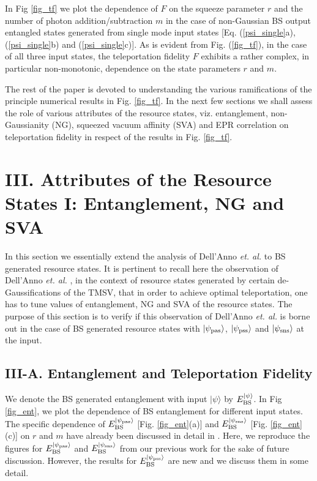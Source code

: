 \documentclass[letter,scriptaddress,twocolumn, prl,showkeys]{revtex4}
\begin{document}
In Fig \ref{fig_tf} we plot the dependence of $F$ on the squeeze parameter $r$ and the number of photon addition/subtraction $m$ in the case of non-Gaussian BS output entangled states generated from single mode input states [Eq. (\ref{psi_single}a), (\ref{psi_single}b) and (\ref{psi_single}c)]. 
As is evident from Fig. (\ref{fig_tf}), in the case of all three input states, the teleportation fidelity $F$ exhibits a rather complex, in particular non-monotonic, dependence on the state parameters $r$ and $m$. 

The rest of the paper is devoted to understanding the various ramifications of the principle numerical results in Fig. \ref{fig_tf}. 
In the next few sections we shall assess the role of various attributes of the resource states, viz. entanglement, non-Gaussianity (NG), squeezed vacuum affinity (SVA) and EPR correlation on teleportation fidelity in respect of the results in Fig. \ref{fig_tf}.

\section*{III. Attributes of the Resource States I: Entanglement, NG and SVA}

In this section we essentially extend the analysis of Dell'Anno \emph{et. al.} \cite{tp_illuminati} to BS generated resource states.
It is pertinent to recall here the observation of Dell'Anno \emph{et. al.} \cite{tp_illuminati}, in the context of resource states generated by certain de-Gaussifications of the TMSV, that in order to achieve optimal teleportation, one has to tune values of entanglement, NG and SVA of the resource states.
The purpose of this section is to verify if this observation of Dell'Anno \emph{et. al.} is borne out in the case of BS generated resource states with $|\psi_{\rm{pas}}\rangle$, $|\psi_{\rm{pss}}\rangle$ and $|\psi_{\rm{sns}}\rangle$ at the input.

\subsection*{III-A. Entanglement and Teleportation Fidelity}

We denote the BS generated entanglement with input $\vert\psi\rangle$ by $E_{\rm{BS}}^{|\psi\rangle}$. 
In Fig \ref{fig_ent}, we plot the dependence of BS entanglement for different input states. 
The specific dependence of $E_{\rm{BS}}^{|\psi_{\rm{pas}}\rangle}$ [Fig. \ref{fig_ent}(a)] and $E_{\rm{BS}}^{|\psi_{\rm{sns}}\rangle}$ [Fig. \ref{fig_ent}(c)] on $r$ and $m$ have already been discussed in detail in \cite{bose_kumar}. 
Here, we reproduce the figures for $E_{\rm{BS}}^{|\psi_{\rm{pas}}\rangle}$ and $E_{\rm{BS}}^{|\psi_{\rm{sns}}\rangle}$ from our previous work \cite{bose_kumar} for the sake of future discussion.
However, the results for $E_{\rm{BS}}^{|\psi_{\rm{pss}}\rangle}$ are new and we discuss them in some detail. 
\end{document}
